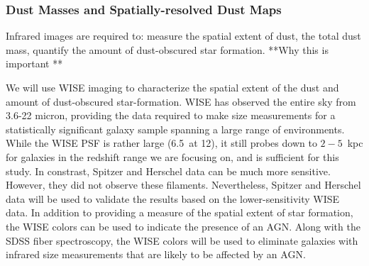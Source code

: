 \documentclass[12pt, preprint]{aastex}
\begin{document}
{%




\vspace*{-1cm}
\subsubsection{Dust Masses and Spatially-resolved Dust Maps}
\vspace*{-.3cm}
\label{wise}
Infrared images are required to: measure the spatial extent of
dust, the total dust mass, quantify the amount of dust-obscured star
formation.  
**Why this is important ** 


We will use WISE imaging to characterize the spatial extent of the
dust and amount of dust-obscured star-formation.  WISE has
observed the entire sky from 3.6-22 micron, providing the data required to make 
size measurements for a statistically significant galaxy sample spanning a
large range of environments. While the WISE PSF is rather large
(6.5\arcsec \ at 12\micron), it
still probes down to $2-5$~kpc for galaxies in the redshift range we are
focusing on, and is sufficient for this study. In constrast, Spitzer
and Herschel data can be much more sensitive. However, they did not
observe these filaments. Nevertheless, Spitzer and Herschel data will be used to validate the
results based on the lower-sensitivity WISE data. In addition to
providing a measure of the spatial extent of star formation, the WISE
colors can be used to indicate the presence of an AGN.  Along with the SDSS fiber
spectroscopy, the WISE colors will be used to eliminate galaxies with
infrared size measurements that are likely to be affected by an AGN.


}
\end{document}
